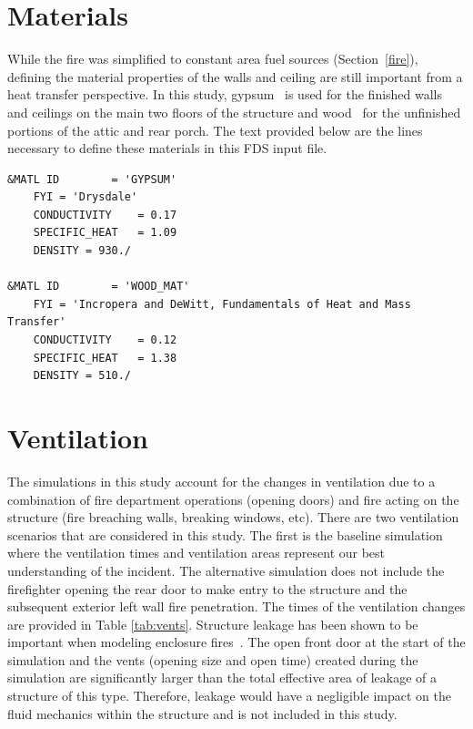 \documentclass[11pt,oneside]{book}
\begin{document}
\section{Materials}
\label{matl}
While the fire was simplified to constant area fuel sources (Section~\ref{fire}), defining the material properties of the walls and ceiling are still important from a heat transfer perspective. In this study, gypsum~\cite{Drysdale:1} is used for the finished walls and ceilings on the main two floors of the structure and wood~\cite{Incropera:1} for the unfinished portions of the attic and rear porch. The text provided below are the lines necessary to define these materials in this FDS input file.

\begin{lstlisting}
&MATL ID        = 'GYPSUM'
    FYI = 'Drysdale' 
    CONDUCTIVITY    = 0.17
    SPECIFIC_HEAT   = 1.09
    DENSITY = 930./

&MATL ID        = 'WOOD_MAT'
    FYI = 'Incropera and DeWitt, Fundamentals of Heat and Mass Transfer'
    CONDUCTIVITY    = 0.12
    SPECIFIC_HEAT   = 1.38
    DENSITY = 510./ 
\end{lstlisting}

\section{Ventilation}
\label{Vents}
The simulations in this study account for the changes in ventilation due to a combination of fire department operations (opening doors) and fire acting on the structure (fire breaching walls, breaking windows, etc). There are two ventilation scenarios that are considered in this study. The first is the baseline simulation where the ventilation times and ventilation areas represent our best understanding of the incident. The alternative simulation does not include the firefighter opening the rear door to make entry to the structure and the subsequent exterior left wall fire penetration. The times of the ventilation changes are provided in Table \ref{tab:vents}. Structure leakage has been shown to be important when modeling enclosure fires~\cite{beal2009}. The open front door at the start of the simulation and the vents (opening size and open time) created during the simulation are significantly larger than the total effective area of leakage of a structure of this type. Therefore, leakage would have a negligible impact on the fluid mechanics within the structure and is not included in this study.
\end{document}
